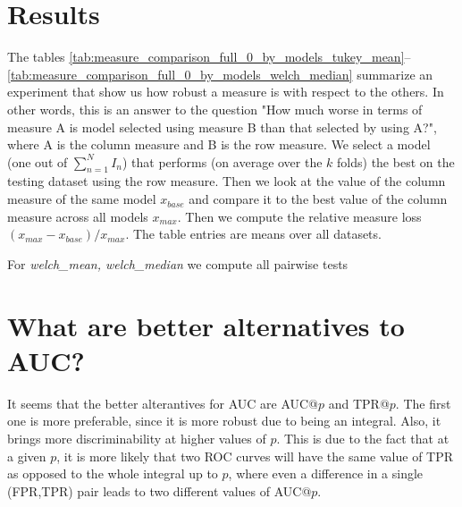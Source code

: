\documentclass[a4paper]{article}
\begin{document}
\section{Results}
The tables \ref{tab:measure_comparison_full_0_by_models_tukey_mean}--\ref{tab:measure_comparison_full_0_by_models_welch_median} summarize an experiment that show us how robust a measure is with respect to the others. In other words, this is an answer to the question "How much worse in terms of measure A is model selected using measure B than that selected by using A?", where A is the column measure and B is the row measure. We select a model (one out of $\sum_{n=1}^N I_n$) that performs (on average over the $k$ folds) the best on the testing dataset using the row measure. Then we look at the value of the column measure of the same model $x_{base}$ and compare it to the best value of the column measure across all models $x_{max}$. Then we compute the relative measure loss $(x_{max}-x_{base})/x_{max}$.  The table entries are means over all datasets.

For \emph{welch_mean, welch_median} we compute all pairwise tests







\section{What are better alternatives to AUC?}
It seems that the better alterantives for AUC are AUC@$p$ and TPR@$p$. The first one is more preferable, since it is more robust due to being an integral. Also, it brings more discriminability at higher values of $p$. This is due to the fact that at a given $p$, it is more likely that two ROC curves will have the same value of TPR as opposed to the whole integral up to $p$, where even a difference in a single (FPR,TPR) pair leads to two different values of AUC@$p$.



\end{document}
